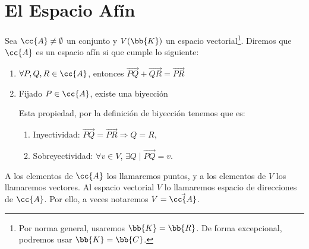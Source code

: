 \chapter{El Espacio Afín}

\begin{definicion}
    Sea $\cc{A}\neq \emptyset$ un conjunto y $V(\bb{K})$ un espacio vectorial\footnote{Por norma general, usaremos $\bb{K}=\bb{R}$. De forma excepcional, podremos usar $\bb{K}=\bb{C}$.}. Diremos que $\cc{A}$ es un espacio afín si
    que cumple lo siguiente:
    \begin{enumerate}
        \item $\forall P,Q,R\in \cc{A}$, entonces $\vec{PQ}+\vec{QR}=\vec{PR}$

        \item Fijado $P\in \cc{A}$, existe una biyección

        Esta propiedad, por la definición de biyección tenemos que es:
        \begin{enumerate}
            \item Inyectividad: $\vec{PQ}=\vec{PR}\Longrightarrow Q=R$,
            \item Sobreyectividad: $\forall v\in V$, $\exists Q\mid \vec{PQ}=v$.
        \end{enumerate}
    \end{enumerate}

    A los elementos de $\cc{A}$ los llamaremos puntos, y a los elementos de $V$ los llamaremos vectores. Al espacio vectorial $V$ lo llamaremos espacio de direcciones de $\cc{A}$. Por ello, a veces notaremos $V=\vec{\cc{A}}$.
\end{definicion}

